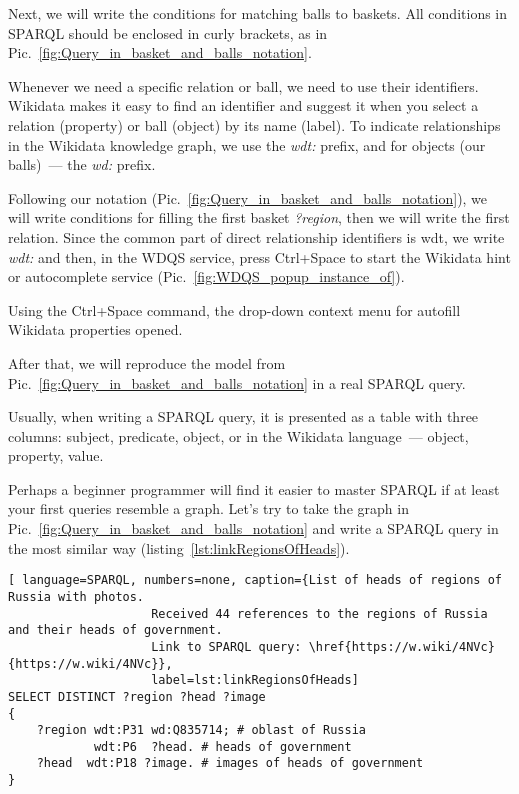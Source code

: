 Next, we will write the conditions for matching balls to baskets. All conditions in SPARQL should be enclosed in curly brackets, as in Pic.~\ref{fig:Query_in_basket_and_balls_notation}.

Whenever we need a specific relation or ball, we need to use their identifiers. Wikidata makes it easy to find an identifier and suggest it when you select a relation (property) or ball (object) by its name (label). To indicate relationships in the Wikidata knowledge graph, we use the \textit{wdt:} prefix, and for objects (our balls)~--- the \textit{wd:} prefix. 

Following our notation (Pic.~\ref{fig:Query_in_basket_and_balls_notation}), we will write conditions for filling the first basket \textit{?region}, then we will write the first relation. Since the common part of direct relationship identifiers is wdt, we write \textit{wdt:} and then, in the WDQS service, press Ctrl+Space to start the Wikidata hint or autocomplete service (Pic.~\ref{fig:WDQS_popup_instance_of}). 

\begin{marginfigure}[-2cm]
	{
		\setlength{\fboxsep}{0pt}%
		\setlength{\fboxrule}{1pt}%
	}
    \caption{Using the Ctrl+Space command, the drop-down context menu for autofill Wikidata properties opened.}
	\label{fig:WDQS_popup_instance_of}
\end{marginfigure}

After that, we will reproduce the model from Pic.~\ref{fig:Query_in_basket_and_balls_notation} in a real SPARQL query.

Usually, when writing a SPARQL query, it is presented as a table with three columns: subject, predicate, object, or in the Wikidata language~--- object, property, value.

Perhaps a beginner programmer will find it easier to master SPARQL if at least your first queries resemble a graph. Let's try to take the graph in Pic.~\ref{fig:Query_in_basket_and_balls_notation} and write a SPARQL query in the most similar way (listing~\ref{lst:linkRegionsOfHeads}).

\begin{lstlisting}[ language=SPARQL, numbers=none, caption={List of heads of regions of Russia with photos. 
                    Received 44 references to the regions of Russia and their heads of government. 
                    Link to SPARQL query: \href{https://w.wiki/4NVc}{https://w.wiki/4NVc}},
                    label=lst:linkRegionsOfHeads]
SELECT DISTINCT ?region ?head ?image
{
    ?region wdt:P31 wd:Q835714; # oblast of Russia
            wdt:P6  ?head. # heads of government
    ?head  wdt:P18 ?image. # images of heads of government
}
\end{lstlisting}

